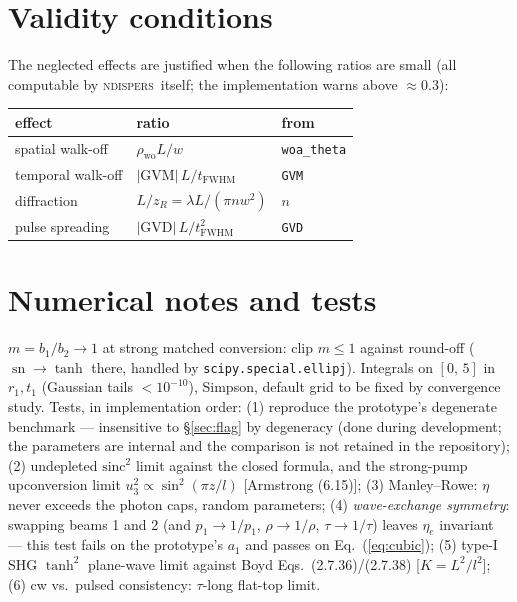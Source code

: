 \documentclass[aps,pra,preprint,amsmath,amssymb,nofootinbib,superscriptaddress]{revtex4-2}
\newcommand{\sn}{\operatorname{sn}}
\newcommand{\ndispers}{\textsc{ndispers}}
\begin{document}
\section{Validity conditions}\label{sec:validity}

The neglected effects are justified when the following ratios are small
(all computable by \ndispers\ itself; the implementation warns above
$\approx0.3$):
\begin{center}
\begin{tabular}{lll}
\toprule
effect & ratio & from \\
\midrule
spatial walk-off & $\rho_{\mathrm{wo}}L/w$ & \texttt{woa\_theta} \\
temporal walk-off & $|\mathrm{GVM}|\,L/t_{\mathrm{FWHM}}$ & \texttt{GVM} \\
diffraction & $L/z_R=\lambda L/(\pi n w^{2})$ & $n$ \\
pulse spreading & $|\mathrm{GVD}|\,L/t_{\mathrm{FWHM}}^{2}$ & \texttt{GVD} \\
\bottomrule
\end{tabular}
\end{center}

\section{Numerical notes and tests}\label{sec:tests}

$m=b_1/b_2\to1$ at strong matched conversion: clip $m\le1$ against
round-off ($\sn\to\tanh$ there, handled by \texttt{scipy.special.ellipj}).
Integrals on $[0,\,5]$ in $r_1,t_1$ (Gaussian tails $<10^{-10}$), Simpson,
default grid to be fixed by convergence study. Tests, in implementation
order: (1) reproduce the prototype's degenerate benchmark --- insensitive
to \S\ref{sec:flag} by degeneracy (done during development; the parameters
are internal and the comparison is not retained in the repository);
(2) undepleted $\mathrm{sinc}^2$ limit against the closed formula, and
the strong-pump upconversion limit $u_3^2\propto\sin^2(\pi z/l)$
[Armstrong (6.15)];
(3) Manley--Rowe: $\eta$ never exceeds the photon caps, random parameters;
(4) \emph{wave-exchange symmetry}: swapping beams 1 and 2 (and
$p_1\to1/p_1$, $\rho\to1/\rho$, $\tau\to1/\tau$) leaves $\eta_e$ invariant
--- this test fails on the prototype's $a_1$ and passes on
Eq.~(\ref{eq:cubic}); (5) type-I SHG $\tanh^2$ plane-wave limit against Boyd
Eqs.~(2.7.36)/(2.7.38) [$K=L^2/l^2$]; (6) cw
vs.\ pulsed consistency: $\tau$-long flat-top limit.
\end{document}
